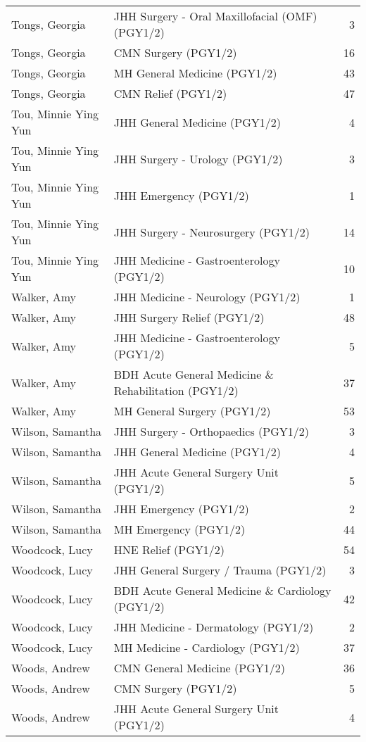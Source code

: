 \documentclass[
]{article}
\begin{document}
\begin{longtable}{llr}
Tongs, Georgia & JHH Surgery - Oral Maxillofacial (OMF) (PGY1/2) & 3 \\ 
Tongs, Georgia & CMN Surgery (PGY1/2) & 16 \\ 
Tongs, Georgia & MH General Medicine (PGY1/2) & 43 \\ 
Tongs, Georgia & CMN Relief (PGY1/2) & 47 \\ 
Tou, Minnie Ying Yun & JHH General Medicine (PGY1/2) & 4 \\ 
Tou, Minnie Ying Yun & JHH Surgery - Urology (PGY1/2) & 3 \\ 
Tou, Minnie Ying Yun & JHH Emergency (PGY1/2) & 1 \\ 
Tou, Minnie Ying Yun & JHH Surgery - Neurosurgery (PGY1/2) & 14 \\ 
Tou, Minnie Ying Yun & JHH Medicine - Gastroenterology (PGY1/2) & 10 \\ 
Walker, Amy & JHH Medicine - Neurology (PGY1/2) & 1 \\ 
Walker, Amy & JHH Surgery Relief (PGY1/2) & 48 \\ 
Walker, Amy & JHH Medicine - Gastroenterology (PGY1/2) & 5 \\ 
Walker, Amy & BDH Acute General Medicine \& Rehabilitation (PGY1/2) & 37 \\ 
Walker, Amy & MH General Surgery (PGY1/2) & 53 \\ 
Wilson, Samantha & JHH Surgery - Orthopaedics (PGY1/2) & 3 \\ 
Wilson, Samantha & JHH General Medicine (PGY1/2) & 4 \\ 
Wilson, Samantha & JHH Acute General Surgery Unit (PGY1/2) & 5 \\ 
Wilson, Samantha & JHH Emergency (PGY1/2) & 2 \\ 
Wilson, Samantha & MH Emergency (PGY1/2) & 44 \\ 
Woodcock, Lucy & HNE Relief (PGY1/2) & 54 \\ 
Woodcock, Lucy & JHH General Surgery / Trauma (PGY1/2) & 3 \\ 
Woodcock, Lucy & BDH Acute General Medicine \& Cardiology (PGY1/2) & 42 \\ 
Woodcock, Lucy & JHH Medicine - Dermatology (PGY1/2) & 2 \\ 
Woodcock, Lucy & MH  Medicine - Cardiology (PGY1/2) & 37 \\ 
Woods, Andrew & CMN General Medicine (PGY1/2) & 36 \\ 
Woods, Andrew & CMN Surgery (PGY1/2) & 5 \\ 
Woods, Andrew & JHH Acute General Surgery Unit (PGY1/2) & 4 \\ 

\end{longtable}
\end{document}
